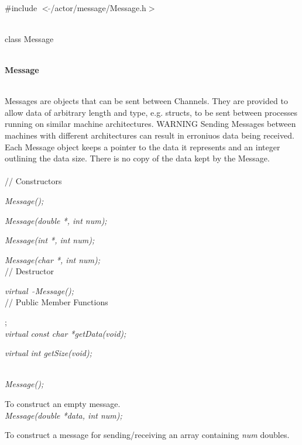 
   \\
\#include $<\tilde{ }$/actor/message/Message.h$>$  


  \\
class Message 


 \\
{\bf Message} 


  \\
\indent Messages are objects that can be sent between Channels. They
are provided to allow data of arbitrary length and type, e.g. structs,
to be sent between processes running on similar machine
architectures. WARNING Sending Messages between machines with different
architectures can result in erroniuos data being received. Each
Message object keeps a pointer to the data it represents and an integer
outlining the data size. There is no copy of the data kept by the
Message. \\


  \\
// Constructors  

{\em Message();}  

{\em Message(double *, int num);}

{\em Message(int *, int num);}

{\em Message(char *, int num);} \\ 

// Destructor 

{\em virtual~ $\tilde{}$Message();}\\  

// Public Member Functions  

; \\  
{\em virtual const char *getData(void);}

{\em virtual int   getSize(void);} 


  \\
{\em Message();}  

To construct an empty message. \\

{\em Message(double *data, int num);}

To construct a message for sending/receiving an array containing {\em
num} doubles. \\

